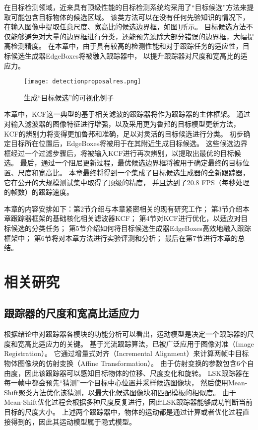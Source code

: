 在目标检测领域，近来具有顶级性能的目标检测系统均采用了``目标候选''方法来提取可能包含目标物体的候选区域。
该类方法可以在没有任何先验知识的情况下，在输入图像中提取任意尺度、宽高比的候选边界框，如图\ref{detectionproposalres}所示。
目标候选方法不仅能够避免对大量的边界框进行分类，还能预先滤除大部分错误的边界框，大幅提高检测精度。
在本章中，由于具有较高的检测性能和对于跟踪任务的适应性，目标候选生成器EdgeBoxes将被融入跟踪器中，
以提升跟踪器对尺度和宽高比的适应力。

\begin{figure}[htb]
\centering
\texttt{[image: detectionproposalres.png]}
\caption{生成``目标候选''的可视化例子}
\label{detectionproposalres}
\end{figure}

本章中，KCF这一典型的基于相关滤波的跟踪器将作为跟踪器的主体框架。
通过对输入滤波器的图像特征进行增强，以及采用更为鲁邦的目标模型更新方法，
KCF的辨别力将变得更加鲁邦和准确，足以对灵活的目标候选进行分类。
初步确定目标所在位置后，EdgeBoxes将被用于在其附近生成目标候选。
这些候选边界框经过一个过滤步骤后，将被输入KCF进行再次辨别，以提取出最优的目标候选。
最后，通过一个阻尼更新过程，最优候选边界框将被用于确定最终的目标位置、尺度和宽高比。
本章最终将得到一个集成了目标候选生成器的全新跟踪器，它在公开的大规模测试集中取得了顶级的精度，
并且达到了20.8 FPS（每秒处理的帧数）的跟踪速度。

本章的内容安排如下：第2节介绍与本章紧密相关的现有研究工作；
第3节介绍本章跟踪器框架的基础\pozhehao 核化相关滤波器KCF；
第4节对KCF进行优化，以适应对目标候选的分类任务；
第5节介绍如何将目标候选生成器EdgeBoxes高效地融入跟踪框架中；
第6节将对本章方法进行实验评测和分析；
最后在第7节进行本章的总结。

\section{相关研究}
\subsection{跟踪器的尺度和宽高比适应力}
根据绪论中对跟踪器各模块的功能分析可以看出，运动模型是决定一个跟踪器的尺度和宽高比适应力的关键。
\cite{survey51}基于光流跟踪算法，已被广泛应用于图像对准（Image Registration）。
它通过增量式对齐（Incremental Alignment）来计算两帧中目标物体图像块的仿射变换（Affine Transformation）。
由于仿射变换的参数包含6个自由度，因此该跟踪器可以感知目标物体的位移、尺度变化和旋转。
LSK跟踪器在每一帧中都会预先``猜测''一个目标中心位置并采样候选图像块，
然后使用Mean-Shift聚类方法优化该猜测，以最大化候选图像块和匹配模板的相似度。
由于Mean-Shift优化过程会根据多种尺度反复进行，因此LSK跟踪器能够成功判断当前目标的尺度大小。
上述两个跟踪器中，物体的运动都是通过计算或者优化过程直接得到的，因此其运动模型属于隐式模型。

